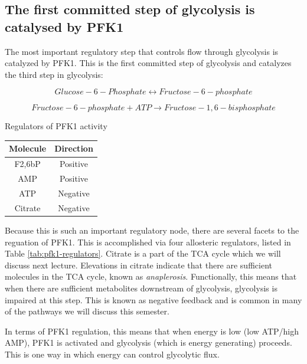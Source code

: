 \documentclass{tufte-handout}
\begin{document}
\subsection{The first committed step of glycolysis is catalysed by PFK1}

The most important regulatory step that controls flow through glycolysis is catalyzed by PFK1.  This is the first committed step of glycolysis and catalyzes the third step in glycolysis:

\begin{equation}
Glucose-6-Phosphate \leftrightarrow Fructose-6-phosphate
\end{equation}

\begin{equation}\label{eq:pfk1}
Fructose-6-phosphate + ATP \rightarrow Fructose-1,6-bisphosphate
\end{equation}

\begin{margintable}
\centering
\caption{Regulators of PFK1 activity}
\label{tab:pfk1-regulators}
\begin{tabular}{cc}
\hline
\textbf {Molecule} & \textbf{Direction}  \\
\hline
F2,6bP & Positive \\
AMP & Positive \\
ATP & Negative \\
Citrate & Negative \\
\hline
\end{tabular}
\end{margintable}

Because this is such an important regulatory node, there are several facets to the reguation of PFK1.  This is accomplished via four allosteric regulators, listed in Table \ref{tab:pfk1-regulators}.  Citrate is a part of the TCA cycle which we will discuss next lecture.  Elevations in citrate indicate that there are sufficient molecules in the TCA cycle, known as \emph{anaplerosis}.  Functionally, this means that when there are sufficient metabolites downstream of glycolysis, glycolysis is impaired at this step.  This is known as negative feedback and is common in many of the pathways we will discuss this semester.

  In terms of PFK1 regulation, this means that when energy is low (low ATP/high AMP), PFK1 is activated and glycolysis (which is energy generating) proceeds.  This is one way in which energy can control glycolytic flux.
\end{document}

